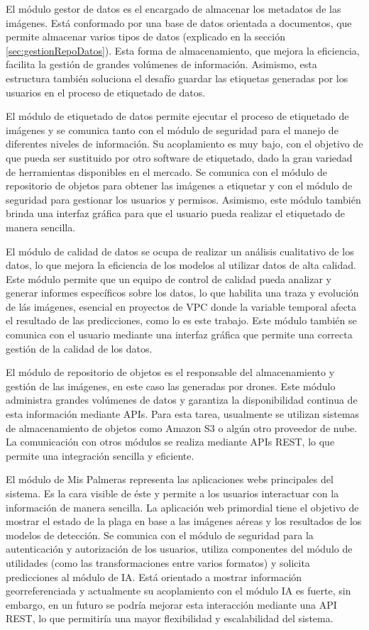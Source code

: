 El módulo gestor de datos es el encargado de almacenar los metadatos de las imágenes. Está conformado por una base de datos orientada a documentos, que permite almacenar varios tipos de datos (explicado en la sección \ref{sec:gestionRepoDatos}). Esta forma de almacenamiento, que mejora la eficiencia, facilita la gestión de grandes volúmenes de información. Asimismo, esta estructura también soluciona el desafío guardar las etiquetas generadas por los usuarios en el proceso de etiquetado de datos.

El módulo de etiquetado de datos permite ejecutar el proceso de etiquetado de imágenes y se comunica tanto con el módulo de seguridad para el manejo de diferentes niveles de información. Su acoplamiento es muy bajo, con el objetivo de que pueda ser sustituido por otro software de etiquetado, dado la gran variedad de herramientas disponibles en el mercado. Se comunica con el módulo de repositorio de objetos para obtener las imágenes a etiquetar y con el módulo de seguridad para gestionar los usuarios y permisos. Asimismo, este módulo también brinda una interfaz gráfica para que el usuario pueda realizar el etiquetado de manera sencilla.

El módulo de calidad de datos se ocupa de realizar un análisis cualitativo de los datos, lo que mejora la eficiencia de los modelos al utilizar datos de alta calidad. Este módulo permite que un equipo de control de calidad pueda analizar y generar informes específicos sobre los datos, lo que habilita una traza y evolución de lás imágenes, esencial en proyectos de VPC donde la variable temporal afecta el resultado de las predicciones, como lo es este trabajo. Este módulo también se comunica con el usuario mediante una interfaz gráfica que permite una correcta gestión de la calidad de los datos.

El módulo de repositorio de objetos es el responsable del almacenamiento y gestión de las imágenes, en este caso las generadas por drones. Este módulo administra grandes volúmenes de datos y garantiza la disponibilidad continua de esta información mediante APIs. Para esta tarea, usualmente se utilizan sistemas de almacenamiento de objetos como Amazon S3 \citep{amazon_web_services_aws_nodate} o algún otro proveedor de nube. La comunicación con otros módulos se realiza mediante APIs REST, lo que permite una integración sencilla y eficiente.

El módulo de Mis Palmeras representa las aplicaciones webs principales del sistema. Es la cara visible de éste y permite a los usuarios interactuar con la información de manera sencilla. La aplicación web primordial tiene el objetivo de mostrar el estado de la plaga en base a las imágenes aéreas y los resultados de los modelos de detección. Se comunica con el módulo de seguridad para la autenticación y autorización de los usuarios, utiliza componentes del módulo de utilidades (como las transformaciones entre varios formatos) y solicita predicciones al módulo de IA. Está orientado a mostrar información georreferenciada y actualmente su acoplamiento con el módulo IA es fuerte, sin embargo, en un futuro se podría mejorar esta interacción mediante una API REST, lo que permitiría una mayor flexibilidad y escalabilidad del sistema.

